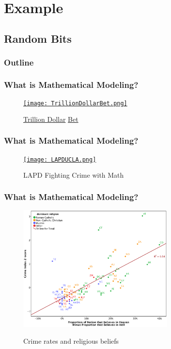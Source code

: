\section{Example}

\subsection{Random Bits}

\begin{frame}
    \frametitle{Outline}
\end{frame}

\begin{frame}
    \frametitle{What is Mathematical Modeling?}
    \begin{figure}
        \centering
        \caption{
        \href{http://www.youtube.com/watch?v=Jzl39jqZjsw&feature=share&list=UUEWRMyobsgQG-PaC9ldME4A}{
        Trillion Dollar} 
        \href{http://www.youtube.com/watch?v=G17rx7H3DtI&feature=BFa&list=UUEWRMyobsgQG-PaC9ldME4A}{Bet}
        }
        \href{http://www.youtube.com/watch?v=dsrOXJwGwtk}{
        \texttt{[image: TrillionDollarBet.png]}
        }
        \label{fig:LTCM}
    \end{figure}
\end{frame}

\begin{frame}
    \frametitle{What is Mathematical Modeling?}
    \begin{figure}
        \centering
        \caption{{LAPD Fighting Crime with Math}}
        \href{http://www.youtube.com/watch?v=HZ7fLuO7zb4}{\texttt{[image: LAPDUCLA.png]}}
        \label{fig:LAPDUCLA}
    \end{figure}
\end{frame}

\begin{frame}[fragile]
    \frametitle{What is Mathematical Modeling?}
        \begin{figure}
            \centering
            \caption{Crime rates and religious beliefs}
            \href{http://www.economist.com/blogs/graphicdetail/2012/09/daily-chart/}{
            \includegraphics[width=0.7\textwidth]{images/hellvsheaven.png}}
    \end{figure}
\end{frame}

